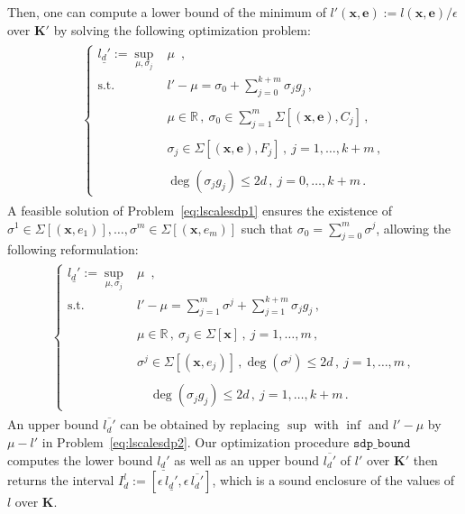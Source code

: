 \documentclass[preprint]{sigplanconf}
\newcommand{\R}{\mathbb{R}}
\newcommand{\x}{\mathbf{x}}
\newcommand{\e}{\mathbf{e}}
\def\K{\mathbf{K}}
\newcommand{\sdpbound}{\mathtt{sdp\_bound}}
\theoremstyle{plain}
\begin{document}
Then, one can compute a lower bound of the minimum of $l'(\x,\e) := l(\x, \e) / \epsilon$ over $\K'$ by solving the following optimization problem:
%
\begin{align}
\begin{split}
\label{eq:lscalesdp1}
\left\{			
\begin{array}{rl}
\underline{l_d'} := \sup\limits_{\mu, \sigma_j} & \mu\enspace, \\	 
\text{s.t.} & l' - \mu = \sigma_0 + \sum_{j = 0}^{k+m} \sigma_j g_j \,, \\
\\
& \mu\in \R \,,\ \sigma_0 \in \sum_{j = 1}^m \Sigma [(\x, \e), C_j] \,, \\
\\
& \sigma_j \in \Sigma[(\x,\e), F_j] \,, \ j = 1,\dots,k+m \,, \\
\\
& \deg (\sigma_j g_j) \leq 2 d  \,, \ j = 0,\dots,k+m \,.
\end{array} \right.
\end{split}
\end{align}
%
A feasible solution of Problem~\eqref{eq:lscalesdp1} ensures the existence of $\sigma^1 \in \Sigma[(\x,e_1)], \dots, \sigma^m \in \Sigma[(\x,e_m)]$ such that $\sigma_0 = \sum_{j=0}^m \sigma^j$, allowing the following reformulation:
%
\begin{align}
\begin{split}
\label{eq:lscalesdp2}
\left\{			
\begin{array}{rl}
\underline{l_d'} := \sup\limits_{\mu, \sigma_j} & \mu\enspace, \\	
\text{s.t.} & l' - \mu = \sum_{j=1}^m \sigma^j + \sum_{j = 1}^{k+m} \sigma_j g_j \,, \\
\\
& \mu\in \R \,, \ \sigma_j \in \Sigma[\x] \,, \ j = 1,\dots,m \,, \\
\\
& \sigma^j  \in \Sigma [(\x, e_j)] \,,  \deg (\sigma^j) \leq 2 d  \,, \ j = 1,\dots,m \,, \\
\\
&  \quad \deg (\sigma_j g_j) \leq 2 d  \,, \ j = 1,\dots,k+m \,.
\end{array} \right.
\end{split}
\end{align}
%
An upper bound $\overline{l_d'}$ can be obtained by replacing $\sup$ with $\inf$ and $l' - \mu$ by $\mu - l'$ in Problem~\eqref{eq:lscalesdp2}.
Our optimization procedure $\sdpbound$ computes the lower bound $\underline{l_d'}$ as well as an upper bound $\overline{l_d'}$ of $l'$ over $\K'$ then returns the interval $I_d^l := [\epsilon \, \underline{l_d'}, \epsilon \, \overline{l_d'}] $, which is a sound enclosure of the values of $l$ over $\K$.
\end{document}
